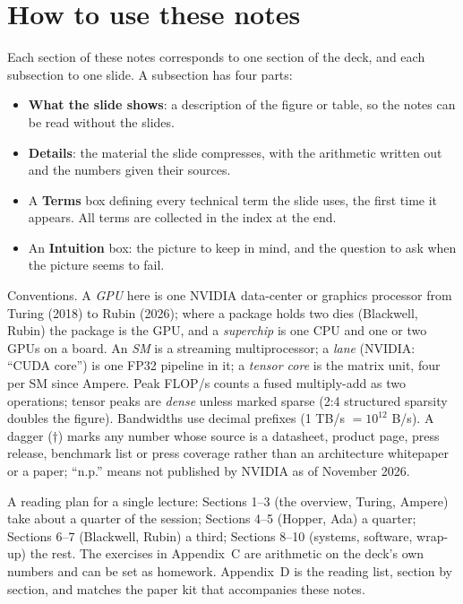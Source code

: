 \documentclass[11pt,letterpaper]{article}
\begin{document}
\tableofcontents
\clearpage

\section*{How to use these notes}
Each section of these notes corresponds to one section of the deck, and each subsection to one slide. A subsection has four parts:
\begin{itemize}
  \item \textbf{What the slide shows}: a description of the figure or table, so the notes can be read without the slides.
  \item \textbf{Details}: the material the slide compresses, with the arithmetic written out and the numbers given their sources.
  \item A \textbf{Terms} box defining every technical term the slide uses, the first time it appears. All terms are collected in the index at the end.
  \item An \textbf{Intuition} box: the picture to keep in mind, and the question to ask when the picture seems to fail.
\end{itemize}
Conventions. A \emph{GPU} here is one NVIDIA data-center or graphics processor from Turing (2018) to Rubin (2026); where a package holds two dies (Blackwell, Rubin) the package is the GPU, and a \emph{superchip} is one CPU and one or two GPUs on a board. An \emph{SM} is a streaming multiprocessor; a \emph{lane} (NVIDIA: ``CUDA core'') is one FP32 pipeline in it; a \emph{tensor core} is the matrix unit, four per SM since Ampere. Peak FLOP/s counts a fused multiply-add as two operations; tensor peaks are \emph{dense} unless marked sparse (2:4 structured sparsity doubles the figure). Bandwidths use decimal prefixes (1 TB/s $=10^{12}$ B/s). A dagger ($\dagger$) marks any number whose source is a datasheet, product page, press release, benchmark list or press coverage rather than an architecture whitepaper or a paper; ``n.p.'' means not published by NVIDIA as of November 2026.

A reading plan for a single lecture: Sections 1--3 (the overview, Turing, Ampere) take about a quarter of the session; Sections 4--5 (Hopper, Ada) a quarter; Sections 6--7 (Blackwell, Rubin) a third; Sections 8--10 (systems, software, wrap-up) the rest. The exercises in Appendix~C are arithmetic on the deck's own numbers and can be set as homework. Appendix~D is the reading list, section by section, and matches the paper kit that accompanies these notes.
\end{document}
